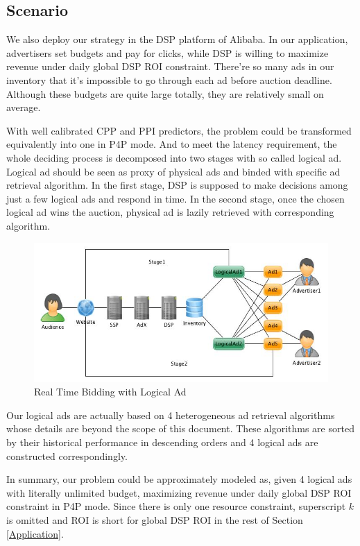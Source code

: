 \documentclass[sigconf]{acmart}
\begin{document}
\subsection{Scenario}

We also deploy our strategy in the DSP platform of Alibaba.
In our application, advertisers set budgets and pay for clicks, while DSP is willing to maximize revenue under daily global DSP ROI constraint.
There're so many ads in our inventory that it's impossible to go through each ad before auction deadline.
Although these budgets are quite large totally, they are relatively small on average.

With well calibrated CPP and PPI predictors, the problem could be transformed equivalently into one in P4P mode.
And to meet the latency requirement, the whole deciding process is decomposed into two stages with so called logical ad.
Logical ad should be seen as proxy of physical ads and binded with specific ad retrieval algorithm.
In the first stage, DSP is supposed to make decisions among just a few logical ads and respond in time.
In the second stage, once the chosen logical ad wins the auction, physical ad is lazily retrieved with corresponding algorithm.

\begin{figure}[!h]
\centering
\includegraphics[width=1.0\linewidth]{./LogicalAd.jpg}
\caption{Real Time Bidding with Logical Ad}
\end{figure}

Our logical ads are actually based on 4 heterogeneous ad retrieval algorithms whose details are beyond the scope of this document.
These algorithms are sorted by their historical performance in descending orders and 4 logical ads are constructed correspondingly.

In summary, our problem could be approximately modeled as, given 4 logical ads with literally unlimited budget,
    maximizing revenue under daily global DSP ROI constraint in P4P mode.
Since there is only one resource constraint, superscript $k$ is omitted and
    ROI is short for global DSP ROI in the rest of Section \ref{Application}.
\end{document}
